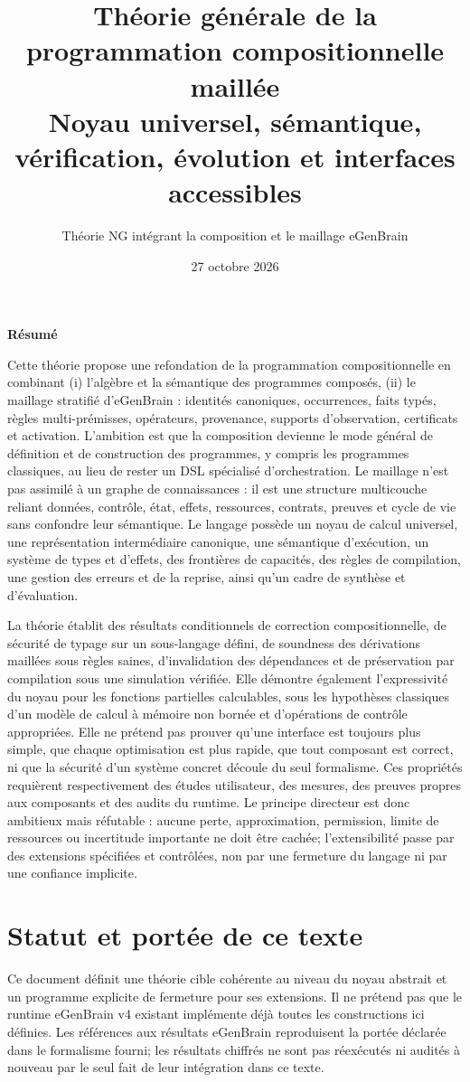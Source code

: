\documentclass[11pt,a4paper,openany]{book}
\title{Théorie générale de la programmation compositionnelle maillée\\\large Noyau universel, sémantique, vérification, évolution et interfaces accessibles}
\author{Théorie NG intégrant la composition et le maillage eGenBrain}
\date{27 octobre 2026}
\theoremstyle{definition}
\theoremstyle{plain}
\theoremstyle{remark}
\newenvironment{abstract}{\begin{center}\bfseries Résumé\end{center}\quotation}{\endquotation}
\begin{document}
\frontmatter
\maketitle
\begin{abstract}
Cette théorie propose une refondation de la programmation compositionnelle en combinant (i) l'algèbre et la sémantique des programmes composés, (ii) le maillage stratifié d'eGenBrain : identités canoniques, occurrences, faits typés, règles multi-prémisses, opérateurs, provenance, supports d'observation, certificats et activation. L'ambition est que la composition devienne le mode général de définition et de construction des programmes, y compris les programmes classiques, au lieu de rester un DSL spécialisé d'orchestration. Le maillage n'est pas assimilé à un graphe de connaissances : il est une structure multicouche reliant données, contrôle, état, effets, ressources, contrats, preuves et cycle de vie sans confondre leur sémantique. Le langage possède un noyau de calcul universel, une représentation intermédiaire canonique, une sémantique d'exécution, un système de types et d'effets, des frontières de capacités, des règles de compilation, une gestion des erreurs et de la reprise, ainsi qu'un cadre de synthèse et d'évaluation.

La théorie établit des résultats conditionnels de correction compositionnelle, de sécurité de typage sur un sous-langage défini, de soundness des dérivations maillées sous règles saines, d'invalidation des dépendances et de préservation par compilation sous une simulation vérifiée. Elle démontre également l'expressivité du noyau pour les fonctions partielles calculables, sous les hypothèses classiques d'un modèle de calcul à mémoire non bornée et d'opérations de contrôle appropriées. Elle ne prétend pas prouver qu'une interface est toujours plus simple, que chaque optimisation est plus rapide, que tout composant est correct, ni que la sécurité d'un système concret découle du seul formalisme. Ces propriétés requièrent respectivement des études utilisateur, des mesures, des preuves propres aux composants et des audits du runtime. Le principe directeur est donc ambitieux mais réfutable : aucune perte, approximation, permission, limite de ressources ou incertitude importante ne doit être cachée; l'extensibilité passe par des extensions spécifiées et contrôlées, non par une fermeture du langage ni par une confiance implicite.
\end{abstract}
\chapter*{Statut et portée de ce texte}
Ce document définit une théorie cible cohérente au niveau du noyau abstrait et un programme explicite de fermeture pour ses extensions. Il ne prétend pas que le runtime eGenBrain v4 existant implémente déjà toutes les constructions ici définies. Les références aux résultats eGenBrain reproduisent la portée déclarée dans le formalisme fourni; les résultats chiffrés ne sont pas réexécutés ni audités à nouveau par le seul fait de leur intégration dans ce texte.
\end{document}

